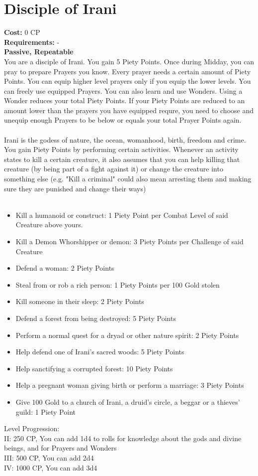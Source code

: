 \section{Disciple of Irani}
\textbf{Cost:} 0 CP\\
\textbf{Requirements:} - \\
\textbf{Passive, Repeatable}\\
You are a disciple of Irani. You gain 5 Piety Points. Once during Midday, you can pray to prepare Prayers you know. Every prayer needs a certain amount of Piety Points. You can equip higher level prayers only if you equip the lower levels. You can freely use equipped Prayers. You can also learn and use Wonders. Using a Wonder reduces your total Piety Points. If your Piety Points are reduced to an amount lower than the prayers you have equipped requre, you need to choose and unequip enough Prayers to be below or equals your total Prayer Points again.\\
\\
Irani is the godess of nature, the ocean, womanhood, birth, freedom and crime. You gain Piety Points by performing certain activities. Whenever an activity states to kill a certain creature, it also assumes that you can help killing that creature (by being part of a fight against it) or change the creature into something else (e.g. "Kill a criminal" could also mean arresting them and making sure they are punished and change their ways)\\
\\
\begin{itemize}
	\item Kill a humanoid or construct: 1 Piety Point per Combat Level of said Creature above yours.
	\item Kill a Demon Whorshipper or demon: 3 Piety Points per Challenge of said Creature
	\item Defend a woman: 2 Piety Points
	\item Steal from or rob a rich person: 1 Piety Points per 100 Gold stolen
	\item Kill someone in their sleep: 2 Piety Points
	\item Defend a forest from being destroyed: 5 Piety Points
	\item Perform a normal quest for a dryad or other nature spirit: 2 Piety Points
	\item Help defend one of Irani's sacred woods: 5 Piety Points
	\item Help sanctifying a corrupted forest: 10 Piety Points
	\item Help a pregnant woman giving birth or perform a marriage: 3 Piety Points
	\item Give 100 Gold to a church of Irani, a druid's circle, a beggar or a thieves' guild: 1 Piety Point
\end{itemize}

Level Progression:\\
II: 250 CP, You can add 1d4 to rolls for knowledge about the gods and divine beings, and for Prayers and Wonders\\
III: 500 CP, You can add 2d4\\
IV: 1000 CP, You can add 3d4\\